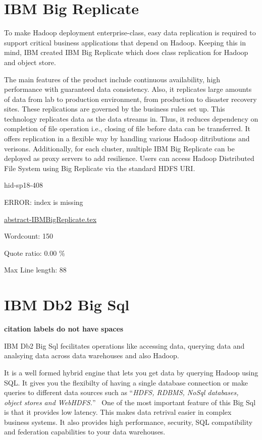 \section{IBM Big Replicate}

To make Hadoop deployment enterprise-class, easy data replication is required 
to support critical business applications that depend on Hadoop. Keeping this 
in mind, IBM created IBM Big Replicate which does class replication for Hadoop
and object store.

The main features of the product include
continuous availability, high performance with guaranteed data 
consistency. Also, it replicates large amounts of data from lab to production 
environment, from production to disaster recovery sites. These replications are
governed by the business rules set up. This technology replicates data as the 
data streams in. Thus, it reduces dependency on completion of file operation 
i.e., closing of file before data can be transferred. It offers replication in
a flexible way by handling various Hadoop ditributions and verisons. 
Additionally, for each cluster, multiple IBM Big Replicate can be deployed as 
proxy servers to add resilience. Users can access Hadoop Distributed File 
System using Big Replicate via the standard HDFS URI\cite{hid-sp18-408-IBMBigReplicate}.

\begin{IU}

hid-sp18-408

ERROR: index is missing

\href{https://github.com/cloudmesh-community/hid-sp18-408/blob/master//technology/abstract-IBMBigReplicate.tex}{abstract-IBMBigReplicate.tex}

 

Wordcount: 150


Quote ratio: 0.00 \%
 
Max Line length: 88
\end{IU}

\section{IBM Db2 Big Sql}

{\bf citation labels do not have spaces}

IBM Db2 Big Sql fecilitates operations like accessing data, querying data and
analsying data across data warehouses and also Hadoop.

It is a well formed hybrid engine that lets you get data by querying 
Hadoop using SQL. It gives you the flexibilty of having a single database
connection or make queries to different data sources such as \color{blue}``\emph{HDFS, RDBMS,
NoSql databases, object stores and WebHDFS.}''\color{black}~\cite{IBM DB2 Bi Sql}
One of the most important feature of this Big Sql is that it provides
low latency. This makes data retrival easier in complex business systems.
It also provides high performance, security, SQL compatibility and federation
capabilities to your data warehouses. 

